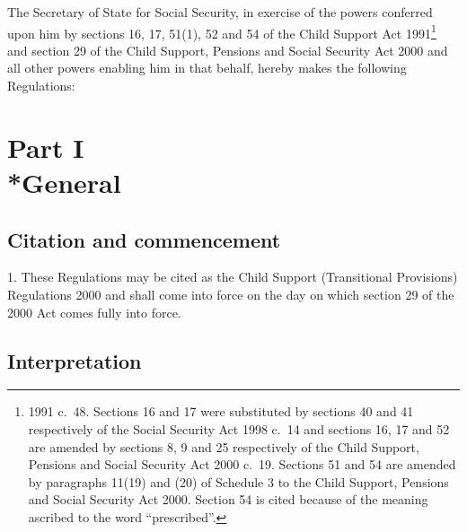 \documentclass[12pt,a4paper]{article}
\title{\regstitle}
\author{S.I. 2000 No. 3186}
\date{Made 4th December 2000\\Laid before Parliament 6th December 2000\\Coming into force as provided in regulation 1(1)}
\begin{document}
\maketitle

\noindent
The Secretary of State for Social Security, in exercise of the powers conferred upon him by sections 16, 17, 51(1), 52 and 54 of the Child Support Act 1991\footnote{1991 c.\ 48. Sections 16 and 17 were substituted by sections 40 and 41 respectively of the Social Security Act 1998 c.\ 14 and sections 16, 17 and 52 are amended by sections 8, 9 and 25 respectively of the Child Support, Pensions and Social Security Act 2000 c.\ 19. Sections 51 and 54 are amended by paragraphs 11(19) and (20) of Schedule 3 to the Child Support, Pensions and Social Security Act 2000. Section 54 is cited because of the meaning ascribed to the word “prescribed”.} and section 29 of the Child Support, Pensions and Social Security Act 2000 and all other powers enabling him in that behalf, hereby makes the following Regulations: 

{\sloppy

\tableofcontents

}

\bigskip

\setcounter{secnumdepth}{-2}

\pagebreak[3]

\section[Part I --- General]{Part I\\*General}

\renewcommand\parthead{--- Part I}

\subsection[1. Citation and commencement]{Citation and commencement}

1.  These Regulations may be cited as the Child Support (Transitional Provisions) Regulations 2000 and shall come into force on the day on which section 29 of the 2000 Act comes fully into force.

\subsection[2. Interpretation]{Interpretation}
\end{document}
